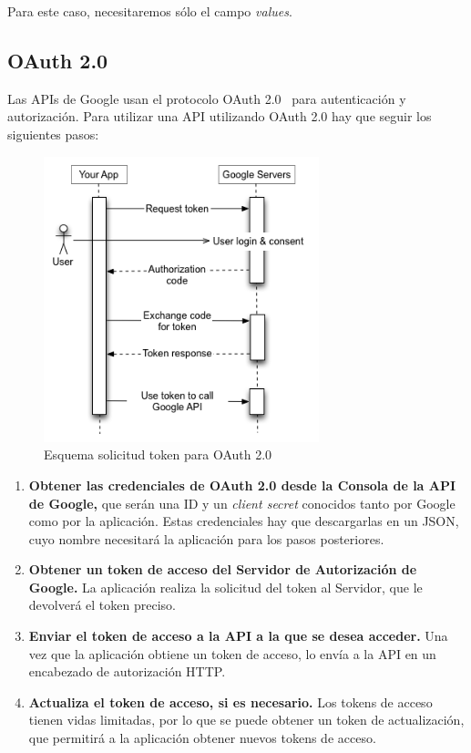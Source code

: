 \documentclass[a4paper, 12pt]{book}
\begin{document}
Para este caso, necesitaremos sólo el campo \textit{values}.


\subsection{OAuth 2.0}
\label{oauth2client}
Las APIs de Google usan el protocolo OAuth 2.0~\cite{oauth2client:1} para autenticación y autorización. Para utilizar una API utilizando OAuth 2.0 hay que seguir los siguientes pasos:
\begin{figure}[h!]
	\centering
	\includegraphics[width=8cm, keepaspectratio]{img/webflow}
	\caption{Esquema solicitud token para OAuth 2.0}
	\label{fig:OAuth}
\end{figure}
\begin{enumerate}
	\item \textbf{Obtener las credenciales de OAuth 2.0 desde la Consola de la API de Google,} que serán una ID y un \textit{client secret} conocidos tanto por Google como por la aplicación. Estas credenciales hay que descargarlas en un JSON, cuyo nombre necesitará la aplicación para los pasos posteriores.
	\item \textbf{Obtener un token de acceso del Servidor de Autorización de Google.} La aplicación realiza la solicitud del token al Servidor, que le devolverá el token preciso.
	\item \textbf{Enviar el token de acceso a la API a la que se desea acceder.} Una vez que la aplicación obtiene un token de acceso, lo envía a la API en un encabezado de autorización HTTP. 
	\item \textbf{Actualiza el token de acceso, si es necesario.} Los tokens de acceso tienen vidas limitadas, por lo que se puede obtener un token de actualización, que permitirá a la aplicación obtener nuevos tokens de acceso.
\end{enumerate}
\end{document}
